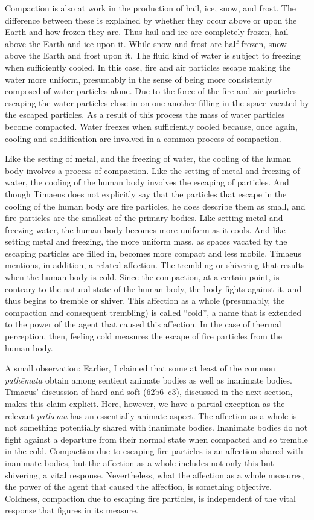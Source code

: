 Compaction is also at work in the production of hail, ice, snow, and frost. The difference between these is explained by whether they occur above or upon the Earth and how frozen they are. Thus hail and ice are completely frozen, hail above the Earth and ice upon it. While snow and frost are half frozen, snow above the Earth and frost upon it. The fluid kind of water is subject to freezing when sufficiently cooled. In this case, fire and air particles escape making the water more uniform, presumably in the sense of being more consistently composed of water particles alone. Due to the force of the fire and air particles escaping the water particles close in on one another filling in the space vacated by the escaped particles. As a result of this process the mass of water particles become compacted. Water freezes when sufficiently cooled because, once again, cooling and solidification are involved in a common process of compaction.


Like the setting of metal, and the freezing of water, the cooling of the human body involves a process of compaction. Like the setting of metal and freezing of water, the cooling of the human body involves the escaping of particles. And though Timaeus does not explicitly say that the particles that escape in the cooling of the human body are fire particles, he does describe them as small, and fire particles are the smallest of the primary bodies. Like setting metal and freezing water, the human body becomes more uniform as it cools. And like setting metal and freezing, the more uniform mass, as spaces vacated by the escaping particles are filled in, becomes more compact and less mobile. Timaeus mentions, in addition, a related affection. The trembling or shivering that results when the human body is cold. Since the compaction, at a certain point, is contrary to the natural state of the human body, the body fights against it, and thus begins to tremble or shiver. This affection as a whole (presumably, the compaction and consequent trembling) is called ``cold'', a name that is extended to the power of the agent that caused this affection. In the case of thermal perception, then, feeling cold measures the escape of fire particles from the human body.

A small observation: Earlier, I claimed that some at least of the common \emph{pathēmata} obtain among sentient animate bodies as well as inanimate bodies. Timaeus' discussion of hard and soft (62b6–c3), discussed in the next section, makes this claim explicit. Here, however, we have a partial exception as the relevant \emph{pathēma} has an essentially animate aspect. The affection as a whole is not something potentially shared with inanimate bodies. Inanimate bodies do not fight against a departure from their normal state when compacted and so tremble in the cold. Compaction due to escaping fire particles is an affection shared with inanimate bodies, but the affection as a whole includes not only this but shivering, a vital response. Nevertheless, what the affection as a whole measures, the power of the agent that caused the affection, is something objective. Coldness, compaction due to escaping fire particles, is independent of the vital response that figures in its measure.


